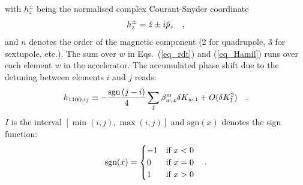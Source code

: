 %
with $h_z^\pm$ being the normalised complex Courant-Snyder coordinate
%
\begin{equation}
  h_z^\pm = \hat{z} \pm i \hat{p}_z
    \quad ,
    \label{eq_courantsnyder}
\end{equation}
%
and $n$ denotes the order of the magnetic component (2 for quadrupole, 3 for sextupole,
etc.).
The sum over $w$ in Eqs.~(\ref{eq_rdt}) and (\ref{eq_Hamil}) runs over each element $w$ in the accelerator.
The accumulated phase shift due to the detuning between elements $i$ and
$j$ reads:
%
\begin{equation}
  h_{1100,ij} \equiv -\frac{\text{sgn}\left( j - i \right)}{4}\sum\limits_{I}\beta_{w,x}^\text{m} \delta K_{w,1} + O(\delta
  K_1^2)\quad .
  \label{eq_h11000-j}
\end{equation}
%
$I$ is the interval $[\min(i,j), \max (i,j)]$ and $\text{sgn}(x)$ denotes the sign function:
%
\begin{equation}
    \text{sgn}(x) =
    \begin{cases}
        -1 & \text{if } x<0\\
        0 &\text{if } x=0\\
        1 &\text{if } x >0
    \end{cases}
    \quad .
    \label{eq_def_sgn_fun}
\end{equation}
%
\label{sec:phasebeating_K1_first}

